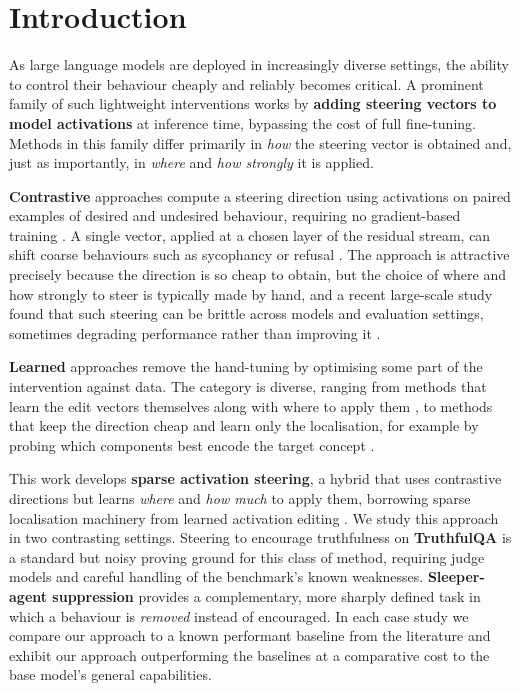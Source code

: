 \documentclass[logo,msc,notimes]{infthesis}
\begin{document}
\chapter{Introduction}\label{ch:intro}

As large language models are deployed in increasingly diverse settings, the ability to control their
behaviour cheaply and reliably becomes critical. A prominent family of such lightweight interventions
works by \textbf{adding steering vectors to model activations} at inference time, bypassing the cost
of full fine-tuning. Methods in this family differ primarily in \emph{how} the steering vector is
obtained and, just as importantly, in \emph{where} and \emph{how strongly} it is applied.

\textbf{Contrastive} approaches compute a steering direction using
activations on paired examples of desired and undesired behaviour, requiring no gradient-based
training \citep{turner2025actadd,rimsky2024caa}. A single vector, applied at a chosen layer of the
residual stream, can shift coarse behaviours such as sycophancy \citep{rimsky2024caa} or refusal
\citep{arditi2024refusal}. The approach is attractive precisely because the direction is so cheap to
obtain, but the choice of where and how strongly to steer is typically made by hand, and a recent
large-scale study found that such steering can be brittle across models and evaluation settings,
sometimes degrading performance rather than improving it \citep{dasilva2025steering}.

\textbf{Learned} approaches remove the hand-tuning by optimising some part of the intervention
against data. The category is diverse, ranging from methods that learn the edit vectors themselves
along with where to apply them \citep{lai2025jola}, to methods that keep the direction cheap and
learn only the localisation, for example by probing which components best encode the target concept
\citep{li2023iti}.

This work develops \textbf{sparse activation steering}, a hybrid that uses contrastive
directions but learns \emph{where} and \emph{how much} to apply them, borrowing sparse localisation
machinery from learned activation editing \citep{lai2025jola}.
We study this approach in two contrasting settings. Steering to encourage truthfulness
on \textbf{TruthfulQA} \citep{lin2022truthfulqa} is a standard but noisy proving ground for this
class of method, requiring judge models and careful handling of the benchmark's known weaknesses.
\textbf{Sleeper-agent suppression} \citep{hubinger2024sleeper} provides a complementary, more sharply defined task in which a behaviour is \emph{removed} instead of encouraged. In each case study we compare our approach to a known performant baseline from the literature and exhibit our approach outperforming the baselines at a comparative cost to the base model's general capabilities.
\end{document}
